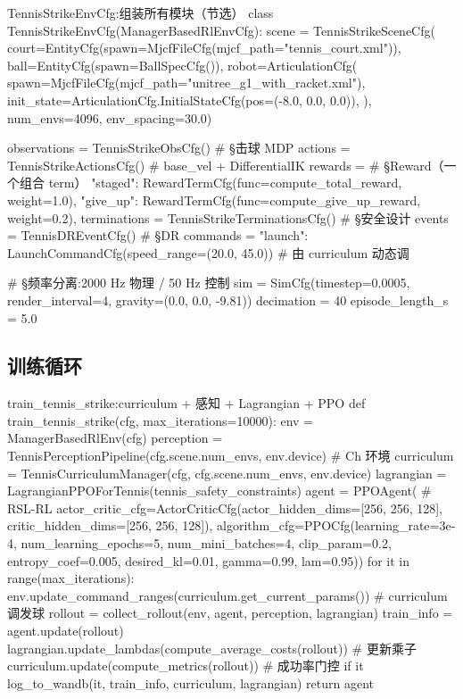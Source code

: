 \begin{codebox}[Python]{TennisStrikeEnvCfg:组装所有模块（节选）}
class TennisStrikeEnvCfg(ManagerBasedRlEnvCfg):
    scene = TennisStrikeSceneCfg(
        court=EntityCfg(spawn=MjcfFileCfg(mjcf_path="tennis_court.xml")),
        ball=EntityCfg(spawn=BallSpecCfg()),
        robot=ArticulationCfg(
            spawn=MjcfFileCfg(mjcf_path="unitree_g1_with_racket.xml"),
            init_state=ArticulationCfg.InitialStateCfg(pos=(-8.0, 0.0, 0.0)),
        ),
        num_envs=4096, env_spacing=30.0)

    observations = TennisStrikeObsCfg()        # §击球 MDP
    actions = TennisStrikeActionsCfg()         # base_vel + DifferentialIK
    rewards = {                                # §Reward（一个组合 term）
        "staged": RewardTermCfg(func=compute_total_reward, weight=1.0),
        "give_up": RewardTermCfg(func=compute_give_up_reward, weight=0.2),
    }
    terminations = TennisStrikeTerminationsCfg()  # §安全设计
    events = TennisDREventCfg()                    # §DR
    commands = {"launch": LaunchCommandCfg(speed_range=(20.0, 45.0))}  # 由 curriculum 动态调

    # §频率分离:2000 Hz 物理 / 50 Hz 控制
    sim = SimCfg(timestep=0.0005, render_interval=4, gravity=(0.0, 0.0, -9.81))
    decimation = 40
    episode_length_s = 5.0
\end{codebox}

\subsection{训练循环}

\begin{codebox}[Python]{train\_tennis\_strike:curriculum + 感知 + Lagrangian + PPO}
def train_tennis_strike(cfg, max_iterations=10000):
    env = ManagerBasedRlEnv(cfg)
    perception = TennisPerceptionPipeline(cfg.scene.num_envs, env.device)  # Ch 环境
    curriculum = TennisCurriculumManager(cfg, cfg.scene.num_envs, env.device)
    lagrangian = LagrangianPPOForTennis(tennis_safety_constraints)
    agent = PPOAgent(                                  # RSL-RL
        actor_critic_cfg=ActorCriticCfg(actor_hidden_dims=[256, 256, 128],
                                        critic_hidden_dims=[256, 256, 128]),
        algorithm_cfg=PPOCfg(learning_rate=3e-4, num_learning_epochs=5,
                             num_mini_batches=4, clip_param=0.2,
                             entropy_coef=0.005, desired_kl=0.01,
                             gamma=0.99, lam=0.95))
    for it in range(max_iterations):
        env.update_command_ranges(curriculum.get_current_params())  # curriculum 调发球
        rollout = collect_rollout(env, agent, perception, lagrangian)
        train_info = agent.update(rollout)
        lagrangian.update_lambdas(compute_average_costs(rollout))    # 更新乘子
        curriculum.update(compute_metrics(rollout))                 # 成功率门控
        if it %
            log_to_wandb(it, train_info, curriculum, lagrangian)
    return agent
\end{codebox}


